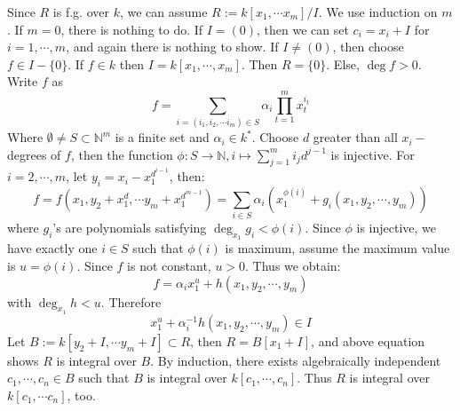 \documentclass{ctexart}
\newcommand\<{\langle}
\renewcommand\>{\rangle}
\newcommand\N{\mathbb{N}}
\def\to{\rightarrow}
\begin{document}
\begin{solution}
    Since $R$ is f.g. over $k$, we can assume $R:=k[x_1,\cdots x_m]/I$. 
    We use induction on $m$. 
    If $m=0$, there is nothing to do. If $I=(0)$, then we can set $c_i=x_i+I$ for $i=1,\cdots ,m$, and again there is nothing to show. 
    If $I\neq (0)$, then choose $f\in I\minus\{0\}$. 
    If $f\in k$ then $I=k[x_1,\cdots,x_m]$. Then $R=\{0\}$. Else, $\deg f>0$. 
    Write $f$ as 
    \begin{equation}
        f=\sum_{i=(i_1,i_2,\cdots i_m)\in S}\alpha_{i}\prod_{t=1}^{m}x_{t}^{i_t}
    \end{equation}
    Where $\emptyset \neq S\subset \N^m$ is a finite set and $\alpha_{i}\in k^*$. Choose $d$ greater than all $x_i-$degrees of $f$, then the function $\phi:S\to \mathbb{N},i\mapsto \sum_{j=1}^mi_jd^{j-1}$ is injective. For $i=2,\cdots,m$, let $y_i=x_i-x_1^{d^{i-1}}$, then:
    \begin{equation}
            f=f\left(x_1,y_2+x_1^d,\cdots y_m+x_1^{d^{m-1}}\right)=\sum_{i\in S} \alpha_i\left(x_1^{\phi(i)}+g_{i}(x_1,y_2,\cdots ,y_m)\right)
    \end{equation}
    where $g_{i}$'s are polynomials satisfying $\deg_{x_1}g_{i}<\phi(i)$. Since $\phi$ is injective, we have exactly one $i\in S$ such that $\phi(i)$ is maximum, assume the maximum value is $u=\phi(i)$. Since $f$ is not constant, $u>0$. Thus we obtain:
    \begin{equation}
        f=\alpha_{i}x_1^u + h(x_1,y_2,\cdots,y_m) 
    \end{equation}
with $\deg_{x_1} h<u$. Therefore
\begin{equation}
    x_1^u+\alpha_{i}^{-1}h(x_1,y_2,\cdots,y_m)\in I
\end{equation}
Let $B:=k[y_2+I,\cdots y_m+I]\subset R$, then $R=B[x_1+I]$, and above equation shows $R$ is integral over $B$. By induction, there exists algebraically independent $c_1,\cdots,c_n\in B$ such that $B$ is integral over $k[c_1,\cdots,c_n]$. Thus $R$ is integral over $k[c_1,\cdots c_n]$, too.
\end{solution}
\end{document}

